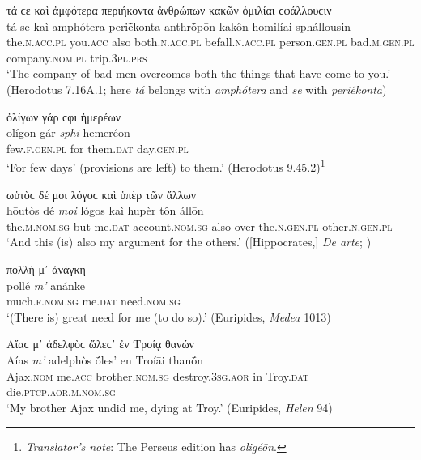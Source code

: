 \begin{exe}
\ex τά ϲε καὶ ἀμφότερα περιήκοντα ἀνθρώπων κακῶν ὁμιλίαι ϲφάλλουϲιν\\
\gll tá se kaì amphótera periḗkonta anthrṓpōn kakôn homilíai sphállousin\\
the.\textsc{n.acc.pl} you.\textsc{acc} also both.\textsc{n.acc.pl}
befall.\textsc{n.acc.pl} person.\textsc{gen.pl} bad.\textsc{m.gen.pl} company.\textsc{nom.pl} trip.\textsc{3pl.prs}\\
\trans `The company of bad men overcomes both the things that have come to you.' (Herodotus 7.16A.1; here \textit{tá} belongs with \textit{amphótera} and \textit{se} with \textit{periḗkonta})
\label{attsep3}
\end{exe}

\begin{exe}
\ex ὀλίγων γάρ ϲφι ἡμερέων\\
\gll olígōn gár \emph{sphi} hēmeréōn\\
few.\textsc{f.gen.pl} for them\textsc{.dat} day.\textsc{gen.pl}\\
\trans `For few days' (provisions are left) to them.' (Herodotus 9.45.2)\footnote{\emph{Translator's note}: The Perseus edition has \textit{oligéōn}.}
\label{attsep4}
\end{exe}

\begin{exe}
\ex ωὑτὸϲ δέ μοι λόγοϲ καὶ ὑπὲρ τῶν ἄλλων\\
\gll hōutòs dé \emph{moi} lógos kaì hupèr tôn állōn\\
the.\textsc{m.nom.sg} but me.\textsc{dat} account.\textsc{nom.sg}
also over the.\textsc{n.gen.pl} other.\textsc{n.gen.pl}\\
\trans `And this (is) also my argument for the others.' ({[}Hippocrates,{]} \textit{De arte}; \citealp[52.18]{Gomperz1890})\\
\label{attsep5}
\end{exe}

\begin{exe}
\ex πολλή μ᾽ ἀνάγκη\\
\gll pollḗ \emph{m'} anánkē\\
much.\textsc{f.nom.sg} me.\textsc{dat} need.\textsc{nom.sg}\\
\trans `(There is) great need for me (to do so).' (Euripides, \textit{Medea} 1013)
\label{attsep6}
\end{exe}

\begin{exe}
\ex Αἴαϲ μ᾽ ἀδελφὸϲ ὤλεϲ᾽ ἐν Τροίᾳ θανών\\
\gll Aías \emph{m'} adelphòs ṓles' en Troíāi thanṓn\\
Ajax.\textsc{nom} me.\textsc{acc} brother.\textsc{nom.sg} destroy.\textsc{3sg.aor} in Troy.\textsc{dat} die.\textsc{ptcp.aor.m.nom.sg}\\
\trans `My brother Ajax undid me, dying at Troy.' (Euripides, \textit{Helen} 94)
\label{attsep7}
\end{exe}

